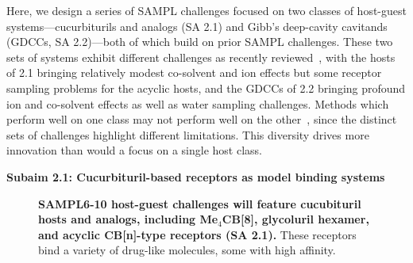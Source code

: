 \documentclass[11pt]{article}
\begin{document}
Here, we design a series of SAMPL challenges focused on two classes of host-guest systems---cucurbiturils and analogs (SA 2.1) and Gibb's deep-cavity cavitands (GDCCs, SA 2.2)---both of which build on prior SAMPL challenges.
These two sets of systems exhibit different challenges as recently reviewed~\cite{mobley_predicting_2016}, with the hosts of 2.1 bringing relatively modest co-solvent and ion effects but some receptor sampling problems for the acyclic hosts, and the GDCCs of 2.2 bringing profound ion and co-solvent effects as well as water sampling challenges.
Methods which perform well on one class may not perform well on the other~\cite{mobley_predicting_2016}, since the distinct sets of challenges highlight different limitations.
This diversity drives more innovation than would a focus on a single host class.




\textbf{Subaim 2.1: Cucurbituril-based receptors as model binding systems}

\begin{figure}[h]
\begin{centering}

\end{centering}

\caption{
\label{figure:CB} \footnotesize {\bf SAMPL6-10 host-guest challenges will feature cucubituril hosts and analogs, including Me$_4$CB[8], glycoluril hexamer, and acyclic CB[n]-type receptors (SA 2.1).} 
These receptors bind a variety of drug-like molecules, some with high affinity.
\vspace{-0.2in}
}
\end{figure}
\end{document}
